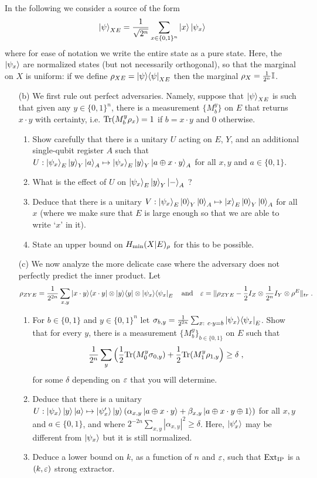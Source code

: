 \documentclass[12pt]{article}
\begin{document}
\begin{enumerate}
In the following we consider a source of the form
\[ \ket{\psi}_{XE}=\frac{1}{\sqrt{2^n}} \sum_{x\in\{0,1\}^n} \ket{x}\ket{\psi_x}\]
where for ease of notation we write the entire state as a pure state. Here, the $\ket{\psi_x}$ are normalized states (but not necessarily orthogonal), so that the marginal on $X$ is uniform: if we define $\rho_{XE} = \ket{\psi}\!\bra{\psi}_{XE}$ then the marginal $\rho_X= \frac{1}{2^n}\mathbb{I}$. 
\begin{enumerate}
\item[(b)] We first rule out perfect adversaries. Namely, suppose that $\ket{\psi}_{XE}$ is such that given any $y\in\{0,1\}^n$, there is a measurement $\{M^y_b\}$ on $E$ that returns $x\cdot y$ with certainty, i.e. $\mathrm{Tr}(M^y_{b} \rho_x)=1$ if $b=x\cdot y$ and $0$ otherwise. 
 \begin{enumerate}
\item Show carefully that there is a unitary $U$ acting on $E$, $Y$, and an additional single-qubit register $A$ such that $U:\ket{\psi_x}_E\ket{y}_Y\ket{a}_A \mapsto \ket{\psi_x}_E\ket{y}_Y\ket{a\oplus x\cdot y}_A$ for all $x,y$ and $a\in\{0,1\}$.
\item What is the effect of $U$ on $\ket{\psi_x}_E\ket{y}_Y\ket{-}_A$ ?
\item Deduce that there is a unitary $V: \ket{\psi_x}_E\ket{0}_Y\ket{0}_A\mapsto \ket{x}_E\ket{0}_Y\ket{0}_A$ for all $x$ (where we make sure that $E$ is large enough so that we are able to write `$x$' in it). 
\item State an upper bound on $H_{\rm min}(X|E)_\rho$ for this to be possible. 
\end{enumerate}
\item[(c)] We now analyze the more delicate case where the adversary does not perfectly predict the inner product. Let 
\[ \rho_{ZYE}=\frac{1}{2^{2n}}\sum_{x,y} \ket{x\cdot y}\!\bra{x\cdot y}\otimes \ket{y}\!\bra{y}\otimes\ket{\psi_x}\!\bra{\psi_x}_E\quad\text{and}\quad\varepsilon = \|\rho_{ZYE} - \frac{1}{2} I_Z\otimes \frac{1}{2^n} I_Y \otimes \rho^E\|_{tr}\;.\]
 \begin{enumerate}
\item For $b\in\{0,1\}$ and $y\in\{0,1\}^n$ let $\sigma_{b,y} = \frac{1}{2^{2n}}\sum_{x:\ c\cdot y=b} \proj{\psi_x}_E$. 
 Show that for every $y$, there is a measurement $\{M^y_b\}_{b\in\{0,1\}}$ on $E$ such that 
\[\frac{1}{2^n}\sum_y \Big(  \frac{1}{2}\mathrm{Tr}(M^y_{0} \sigma_{0,y})+\frac{1}{2}\mathrm{Tr}(M^y_{1} \rho_{1,y}\Big) \geq \delta\;,\]
 for some $\delta$ depending on $\varepsilon$ that you will determine. 
\item Deduce that there is a unitary $U:\ket{\psi_x}\ket{y}\ket{a} \mapsto \ket{\psi'_x}\ket{y}(\alpha_{x,y}\ket{a\oplus x\cdot y}+\beta_{x,y}\ket{a\oplus x\cdot y\oplus 1})$ for all $x,y$ and $a\in\{0,1\}$, and where $2^{-2n}\sum_{x,y} |\alpha_{x,y}|^2 \geq \delta$. Here, $\ket{\psi'_x}$ may be different from $\ket{\psi_x}$ but it is still normalized.
\item Deduce a lower bound on $k$, as a function of $n$ and $\varepsilon$, such that $\mathrm{Ext}_{\mathrm{IP}}$ is a $(k,\varepsilon)$ strong extractor.  
\end{enumerate}
\end{enumerate}

\end{enumerate}
\end{document}

